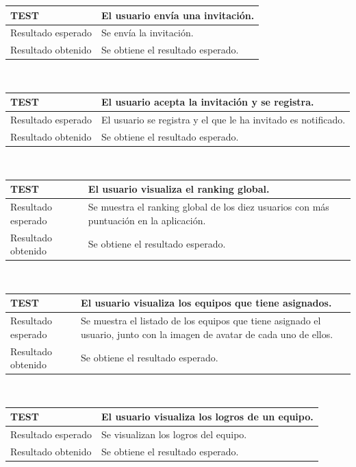 \documentclass[twoside]{report}
\newcommand\addrow[2]{#1 &#2\\ }
\newcommand\addheading[2]{#1 &#2\\ \hline}
\newcommand\tabularhead{\begin{tabular}{lp{0.7\textwidth}}
\hline
}
\newenvironment{test}{\tabularhead}
{\hline\end{tabular}}
\begin{document}
\vspace{0.5cm}

\begin{test}
  \addheading{\textbf{TEST\arabic{test}}}{El usuario envía una invitación.} 
  \addrow{Resultado esperado}{Se envía la invitación.}
  \addrow{Resultado obtenido}{Se obtiene el resultado esperado.}
\end{test}\\

\vspace{0.5cm}

\begin{test}
  \addheading{\textbf{TEST\arabic{test}}}{El usuario acepta la invitación y se registra.} 
  \addrow{Resultado esperado}{El usuario se registra y el que le ha invitado es notificado.}
  \addrow{Resultado obtenido}{Se obtiene el resultado esperado.}
\end{test}\\

\vspace{0.5cm}

\begin{test}
  \addheading{\textbf{TEST\arabic{test}}}{El usuario visualiza el ranking global.} 
  \addrow{Resultado esperado}{Se muestra el ranking global de los diez usuarios con más puntuación en la aplicación.}
  \addrow{Resultado obtenido}{Se obtiene el resultado esperado.}
\end{test}\\

\vspace{0.5cm}

\begin{test}
  \addheading{\textbf{TEST\arabic{test}}}{El usuario visualiza los equipos que tiene asignados.} 
  \addrow{Resultado esperado}{Se muestra el listado de los equipos que tiene asignado el usuario, junto con la imagen de avatar de cada uno de ellos.}
  \addrow{Resultado obtenido}{Se obtiene el resultado esperado.}
\end{test}\\

\vspace{0.5cm}

\begin{test}
  \addheading{\textbf{TEST\arabic{test}}}{El usuario visualiza los logros de un equipo.} 
  \addrow{Resultado esperado}{Se visualizan los logros del equipo.}
  \addrow{Resultado obtenido}{Se obtiene el resultado esperado.}
\end{test}\\
\end{document}
